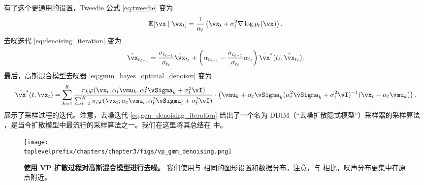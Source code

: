 \documentclass[../../book-main.tex]{subfiles}
\begin{document}
有了这个更通用的设置，Tweedie 公式 \eqref{eq:tweedie} 变为
\begin{equation}\label{eq:gen_tweedie}
	\Ex[\vx \mid \vx_{t}] = \frac{1}{\alpha_{t}}\bp{\vx_{t} + \sigma_{t}^{2}\nabla \log p_{t}(\vx)}.
\end{equation}
去噪迭代 \eqref{eq:denoising_iteration} 变为
\begin{equation}\label{eq:gen_denoising_iteration}
	\hat{\vx}_{t_{\ell - 1}} = \frac{\sigma_{t_{\ell - 1}}}{\sigma_{t_{\ell}}}\hat{\vx}_{t_{\ell}} + \bp{\alpha_{t_{\ell - 1}} - \frac{\sigma_{t_{\ell - 1}}}{\sigma_{t_{\ell}}}\alpha_{t_{\ell}}}\bar{\vx}^{\ast}(t_{\ell}, \hat{\vx}_{t_{\ell}}).
\end{equation}
最后，高斯混合模型去噪器 \eqref{eq:gmm_bayes_optimal_denoiser} 变为
\begin{equation}\label{eq:gen_gmm_bayes_optimal_denoiser}
	\bar{\vx}^{\ast}(t, \vx_{t}) = \sum_{k = 1}^{K}\frac{\pi_{k}\phi(\vx_{t}
	; \alpha_{t}\vmu_{k}, \alpha_{t}^{2}\vSigma_{k}
	+ \sigma_{t}^{2}\vI)}{\sum_{i = 1}^{K}\pi_{i}\phi(\vx_{t} ; \alpha_{t}\vmu_{i}, \alpha_{t}^{2}\vSigma_{i} + \sigma_{t}^{2}\vI)}\cdot\bp{\vmu_{k} + \alpha_{t}\vSigma_{k}(\alpha_{t}^{2}\vSigma_{k} + \sigma_{t}^{2}\vI)^{-1}(\vx_{t} - \alpha_{t}\vmu_{k})}.
\end{equation}
 展示了采样过程的迭代。注意，去噪迭代 \eqref{eq:gen_denoising_iteration} 给出了一个名为 DDIM（“去噪扩散隐式模型”）采样器的采样算法 \cite{song2020denoising}，是当今扩散模型中最流行的采样算法之一。我们在这里将其总结在  中。

\begin{figure}
	\centering 
	\texttt{[image: \\toplevelprefix/chapters/chapter3/figs/vp\_gmm\_denoising.png]}
	\caption{\small\textbf{使用 VP 扩散过程对高斯混合模型进行去噪。} 我们使用与  相同的图形设置和数据分布。注意，与  相比，噪声分布更集中在原点附近。}
	\label{fig:vp_gmm_denoising}
\end{figure}
\end{document}
